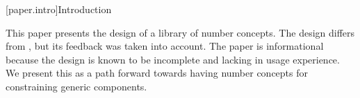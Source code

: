 

[paper.intro]{Introduction}

\pnum
This paper presents the design of a library of number concepts.
The design differs from , but its feedback was taken into account.
The paper is informational because the design is known to be incomplete and lacking in usage experience.
We present this as a path forward towards having number concepts for constraining generic components.

